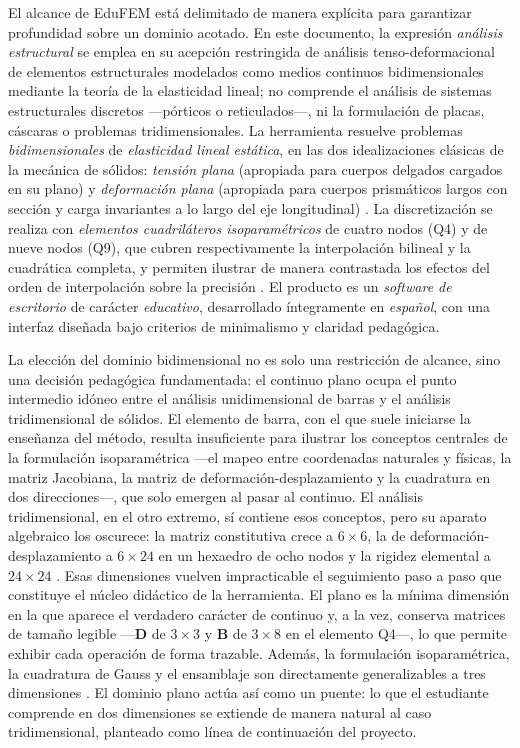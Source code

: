 El alcance de EduFEM está delimitado de manera explícita para garantizar profundidad sobre un dominio acotado. En este documento, la expresión \emph{análisis estructural} se emplea en su acepción restringida de análisis tenso-deformacional de elementos estructurales modelados como medios continuos bidimensionales mediante la teoría de la elasticidad lineal; no comprende el análisis de sistemas estructurales discretos —pórticos o reticulados—, ni la formulación de placas, cáscaras o problemas tridimensionales. La herramienta resuelve problemas \emph{bidimensionales} de \emph{elasticidad lineal estática}, en las dos idealizaciones clásicas de la mecánica de sólidos: \emph{tensión plana} (apropiada para cuerpos delgados cargados en su plano) y \emph{deformación plana} (apropiada para cuerpos prismáticos largos con sección y carga invariantes a lo largo del eje longitudinal) \autocite{timoshenko1970elasticity}. La discretización se realiza con \emph{elementos cuadriláteros isoparamétricos} de cuatro nodos (Q4) y de nueve nodos (Q9), que cubren respectivamente la interpolación bilineal y la cuadrática completa, y permiten ilustrar de manera contrastada los efectos del orden de interpolación sobre la precisión \autocite{hughes2000fem,onate2009structural}. El producto es un \emph{software de escritorio} de carácter \emph{educativo}, desarrollado íntegramente en \emph{español}, con una interfaz diseñada bajo criterios de minimalismo y claridad pedagógica.

La elección del dominio bidimensional no es solo una restricción de alcance, sino una decisión pedagógica fundamentada: el continuo plano ocupa el punto intermedio idóneo entre el análisis unidimensional de barras y el análisis tridimensional de sólidos. El elemento de barra, con el que suele iniciarse la enseñanza del método, resulta insuficiente para ilustrar los conceptos centrales de la formulación isoparamétrica —el mapeo entre coordenadas naturales y físicas, la matriz Jacobiana, la matriz de deformación-desplazamiento y la cuadratura en dos direcciones—, que solo emergen al pasar al continuo. El análisis tridimensional, en el otro extremo, sí contiene esos conceptos, pero su aparato algebraico los oscurece: la matriz constitutiva crece a $6\times6$, la de deformación-desplazamiento a $6\times24$ en un hexaedro de ocho nodos y la rigidez elemental a $24\times24$ \autocite{cook2002concepts}. Esas dimensiones vuelven impracticable el seguimiento paso a paso que constituye el núcleo didáctico de la herramienta. El plano es la mínima dimensión en la que aparece el verdadero carácter de continuo y, a la vez, conserva matrices de tamaño legible —$\bm{D}$ de $3\times3$ y $\bm{B}$ de $3\times8$ en el elemento Q4—, lo que permite exhibir cada operación de forma trazable. Además, la formulación isoparamétrica, la cuadratura de Gauss y el ensamblaje son directamente generalizables a tres dimensiones \autocite{bathe2014fem,zienkiewicz2013fem}. El dominio plano actúa así como un puente: lo que el estudiante comprende en dos dimensiones se extiende de manera natural al caso tridimensional, planteado como línea de continuación del proyecto.

